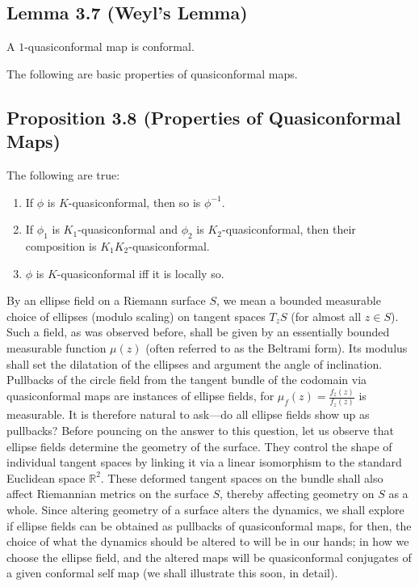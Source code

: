 \documentclass[11pt,a4paper]{article}
\begin{document}
        \subsection*{Lemma 3.7 (Weyl's Lemma)} A $1$-quasiconformal map is conformal.



        The following are basic properties of quasiconformal maps.

        \subsection*{Proposition 3.8 (Properties of Quasiconformal Maps)} The following are true:
        \begin{enumerate}
            \item If $\phi$ is $K$-quasiconformal, then so is $\phi^{-1}$.
            \item If $\phi_1$ is $K_1$-quasiconformal and $\phi_2$ is $K_2$-quasiconformal, then their composition is $K_1K_2$-quasiconformal.
            \item $\phi$ is $K$-quasiconformal iff it is locally so.
        \end{enumerate}



        By an ellipse field on a Riemann surface $S$, we mean a bounded measurable choice of ellipses (modulo scaling) on tangent spaces $T_zS$ (for almost all $z \in S$). Such a field, as was observed before, shall be given by an essentially bounded measurable function $\mu(z)$ (often referred to as the Beltrami form). Its modulus shall set the dilatation of the ellipses and argument the angle of inclination. Pullbacks of the circle field from the tangent bundle of the codomain via quasiconformal maps are instances of ellipse fields, for $\mu_f(z)=\frac{f_{\overline z}(z)}{f_z(z)}$ is measurable. It is therefore natural to ask---do all ellipse fields show up as pullbacks? Before pouncing on the answer to this question, let us observe that ellipse fields determine the geometry of the surface. They control the shape of individual tangent spaces by linking it via a linear isomorphism to the standard Euclidean space $\mathbb{R}^2$. These deformed tangent spaces on the bundle shall also affect Riemannian metrics on the surface $S$, thereby affecting geometry on $S$ as a whole. Since altering geometry of a surface alters the dynamics, we shall explore if ellipse fields can be obtained as pullbacks of quasiconformal maps, for then, the choice of what the dynamics should be altered to will be in our hands; in how we choose the ellipse field, and the altered maps will be quasiconformal conjugates of a given conformal self map (we shall illustrate this soon, in detail).
\end{document}
